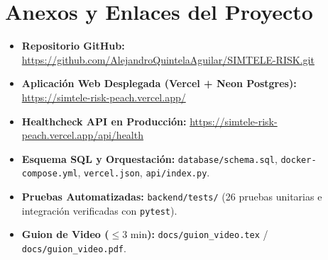 \documentclass[11pt,a4paper]{article}
\begin{document}
\section{Anexos y Enlaces del Proyecto}
\begin{itemize}[noitemsep]
    \item \textbf{Repositorio GitHub:} \url{https://github.com/AlejandroQuintelaAguilar/SIMTELE-RISK.git}
    \item \textbf{Aplicación Web Desplegada (Vercel + Neon Postgres):} \url{https://simtele-risk-peach.vercel.app/}
    \item \textbf{Healthcheck API en Producción:} \url{https://simtele-risk-peach.vercel.app/api/health}
    \item \textbf{Esquema SQL y Orquestación:} \texttt{database/schema.sql}, \texttt{docker-compose.yml}, \texttt{vercel.json}, \texttt{api/index.py}.
    \item \textbf{Pruebas Automatizadas:} \texttt{backend/tests/} (26 pruebas unitarias e integración verificadas con \texttt{pytest}).
    \item \textbf{Guion de Video ($\le 3\text{ min}$):} \texttt{docs/guion\_video.tex} / \texttt{docs/guion\_video.pdf}.
\end{itemize}
\end{document}
